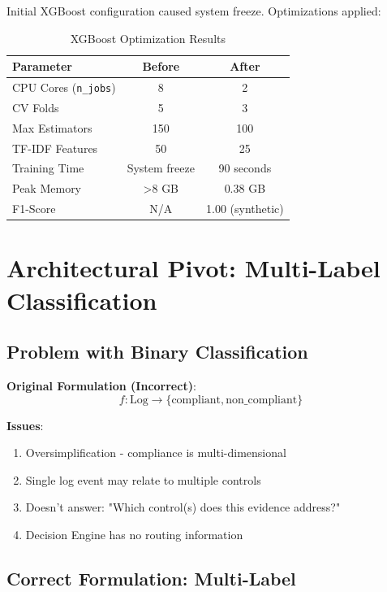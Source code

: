 \documentclass[11pt,conference]{IEEEtran}
\begin{document}
Initial XGBoost configuration caused system freeze. Optimizations applied:

\begin{table}[h]
\centering
\caption{XGBoost Optimization Results}
\begin{tabular}{|l|c|c|}
\hline
\textbf{Parameter} & \textbf{Before} & \textbf{After} \\
\hline
CPU Cores (\texttt{n\_jobs}) & 8 & 2 \\
\hline
CV Folds & 5 & 3 \\
\hline
Max Estimators & 150 & 100 \\
\hline
TF-IDF Features & 50 & 25 \\
\hline
Training Time & System freeze & 90 seconds \\
\hline
Peak Memory & >8 GB & 0.38 GB \\
\hline
F1-Score & N/A & 1.00 (synthetic) \\
\hline
\end{tabular}
\end{table}

\section{Architectural Pivot: Multi-Label Classification}

\subsection{Problem with Binary Classification}

\textbf{Original Formulation (Incorrect)}:
\begin{equation}
f: \text{Log} \rightarrow \{\text{compliant}, \text{non\_compliant}\}
\end{equation}

\textbf{Issues}:
\begin{enumerate}
    \item Oversimplification - compliance is multi-dimensional
    \item Single log event may relate to multiple controls
    \item Doesn't answer: "Which control(s) does this evidence address?"
    \item Decision Engine has no routing information
\end{enumerate}

\subsection{Correct Formulation: Multi-Label}
\end{document}
